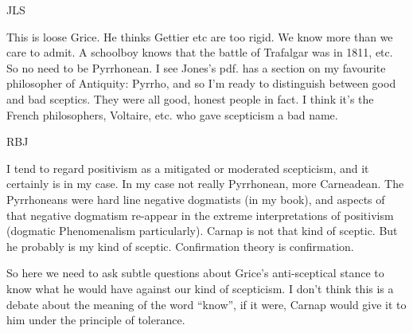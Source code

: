 \documentclass[10pt,titlepage]{book}
\newcommand{\ignore}[1]{}
\begin{document}
JLS

This is loose Grice. He thinks Gettier etc are too rigid. We  
know more than we care to admit. A schoolboy knows that the battle of 
Trafalgar  was in 1811, etc. So no need to be Pyrrhonean. I see Jones's pdf. has a 
section  on my favourite philosopher of Antiquity: Pyrrho, and so I'm ready 
to  distinguish between good and bad sceptics. They were all good, honest 
people in  fact. I think it's the French philosophers, Voltaire, etc. who gave 
scepticism a  bad name.

RBJ

I tend to regard positivism as a mitigated or moderated scepticism, and it certainly is in my case.
In my case not really Pyrrhonean, more Carneadean.
The Pyrrhoneans were hard line negative dogmatists (in my book), and aspects of that negative dogmatism re-appear in the extreme interpretations of positivism (dogmatic Phenomenalism particularly).
Carnap is not that kind of sceptic.
But he probably is my kind of sceptic.
Confirmation theory is confirmation.

So here we need to ask subtle questions about Grice's anti-sceptical stance to know what he would have against our kind of scepticism.
I don't think this is a debate about the meaning of the word ``know'', if it were, Carnap would give it to him under the principle of tolerance.

\ignore{
\subsection{Positivism}

Next I'd like to address the differing perceptions of Speranza and myself in relation to Grice's attitude towards such as Carnap.

Grice thought of himself as a kind of ``ordinary language philosopher'' or at the least, a philosopher who saw some point and philosophical value in studying ``ordinary language'' as it is.
His predecessor Austin severely criticised aspects of positivism in his ``Sense and Sensibility'', and appeared an implacable opponent.

Grice's position was more moderate, several parts of his work made him appear to me less antagonistic.

\subsection{Reductionism}\index{reductionism}

We want to know whether the very specific kind of reductionism which Grice's rejected would embrace any or all of Carnap's reductionist tendencies.

Now, according to Speranza, the specific notion of reductionism which Grice rejected was that of reductive analysis of semantics in which the reduction takes place to some single kind of entity.
This looks like it is intended to include dogmatic Phenomenalism as a doctrine about semantics, which, apart from the dogmatic bit is what Carnap was doing in the Aufbau.
}
\end{document}
